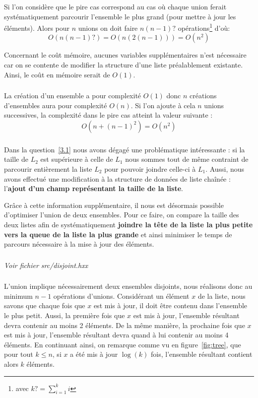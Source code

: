 \documentclass[10pt,a4paper]{article}
\begin{document}
{{Si l'on considère que le pire cas correspond au cas où chaque union ferait systématiquement parcourir l'ensemble le plus grand (pour mettre à jour les éléments). Alors pour $n$ unions on doit faire $n(n-1)?$ opérations\footnote{avec $k? = \sum\limits_{i=1}^{k}{i}$} d'où:
$$O(n(n-1)?) =  O(n(2(n-1))) = O(n^2)$$

Concernant le coût mémoire, aucunes variables supplémentaires n'est nécessaire car on se contente de modifier la structure d'une liste préalablement existante. Ainsi, le coût en mémoire serait de $O(1)$.
\subsubsection{}
La création d'un ensemble a pour complexité $O(1)$ donc $n$ créations d'ensembles aura pour complexité $O(n)$. Si l'on ajoute à cela $n$ unions successives, la complexité dans le pire cas atteint la valeur suivante :
$$O(n + (n-1)^2) = O(n^2)$$

\subsubsection{}
Dans la question~\ref{3.1} nous avons dégagé une problématique intéressante : si la taille de $L_{2}$ est supérieure à celle de $L_{1}$ nous sommes tout de même contraint de parcourir entièrement la liste $L_{2}$ pour pouvoir joindre celle-ci à $L_{1}$. Aussi, nous avons effectué une modification à la structure de données de liste chaînée : l'\textbf{ajout d'un champ représentant la taille de la liste}.

Grâce à cette information supplémentaire, il nous est désormais possible d'optimiser l'union de deux ensembles. Pour ce faire, on compare la taille des deux listes afin de systématiquement \textbf{joindre la tête de la liste la plus petite vers la queue de la liste la plus grande} et ainsi minimiser le temps de parcours nécessaire à la mise à jour des éléments.

\subsubsection{}
\textit{Voir fichier src/disjoint.hxx}

\subsubsection{}\label{3.5}
L'union implique nécessairement deux ensembles disjoints, nous réalisons donc au minimum $n-1$ opérations d'unions. Considérant un élément $x$ de la liste, nous savons que chaque fois que $x$ est mis à jour, il doit être contenu dans l'ensemble le plus petit. Aussi, la première fois que $x$ est mis à jour, l'ensemble résultant devra contenir au moins 2 éléments. De la même manière, la prochaine fois que $x$ est mis à jour, l'ensemble résultant devra quand à lui contenir au moins 4 éléments. En continuant ainsi, on remarque comme vu en figure~\ref{fig:tree}, que pour tout $k \leq n$, si $x$ a été mis à jour $\log(k)$ fois, l'ensemble résultant contient alors $k$ éléments.\\

}}
\end{document}
